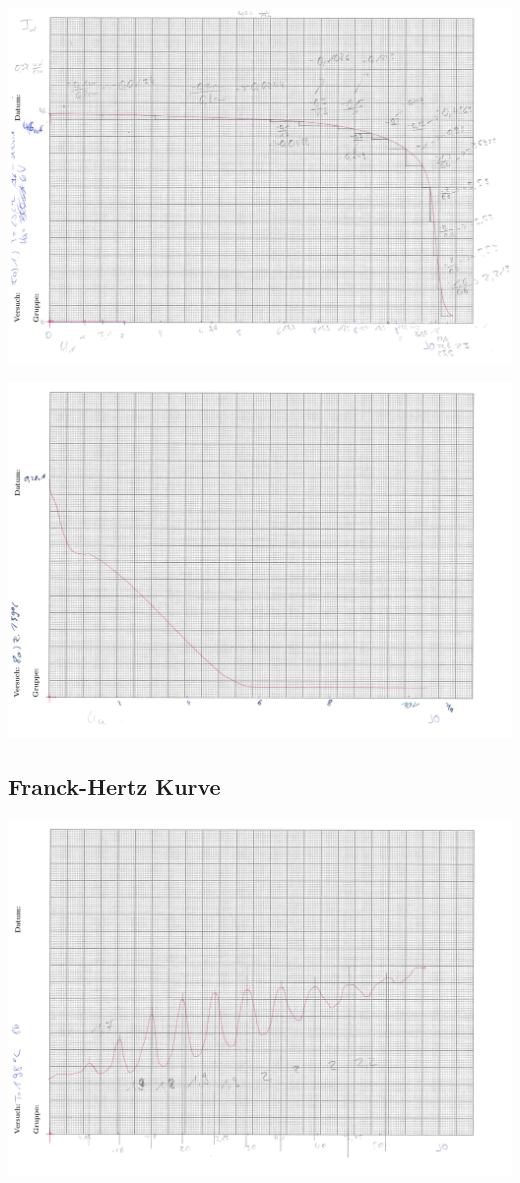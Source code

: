 \begin{landscape}
\includegraphics[page = 1, scale = 0.5]{8a1.pdf}
\label{fig:8a1}
\end{landscape}
\begin{landscape}
\includegraphics[page = 1, scale = 0.5]{8a2.pdf}
\label{fig:8a2}
\end{landscape}
\subsection{Franck-Hertz Kurve}
\begin{landscape}
\includegraphics[page = 1, scale = 0.5]{8b.pdf}
\label{fig:8b}
\end{landscape}
